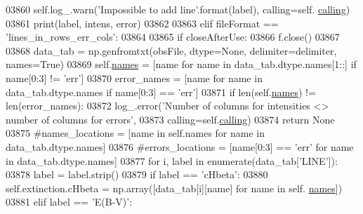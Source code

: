 \begin{DoxyCode}
03860                         self.log\_.warn(\textcolor{stringliteral}{'Impossible to add line'}.format(label), calling=self.
      \hyperlink{classpyneb_1_1core_1_1pynebcore_1_1_observation_a2639fad9af4fefad20e4097295bd40e7}{calling})
03861                         print(label, intens, error)
03862                         
03863         \textcolor{keywordflow}{elif} fileFormat == \textcolor{stringliteral}{'lines\_in\_rows\_err\_cols'}:
03864             
03865             \textcolor{keywordflow}{if} closeAfterUse:
03866                 f.close()
03867                 
03868             data\_tab = np.genfromtxt(obsFile, dtype=\textcolor{keywordtype}{None}, delimiter=delimiter, names=\textcolor{keyword}{True})
03869             self.\hyperlink{classpyneb_1_1core_1_1pynebcore_1_1_observation_a3f365d0b1488b2eba300bf71caf23c17}{names} = [name \textcolor{keywordflow}{for} name \textcolor{keywordflow}{in} data\_tab.dtype.names[1::] \textcolor{keywordflow}{if} name[0:3] != \textcolor{stringliteral}{'err'}]
03870             error\_names = [name \textcolor{keywordflow}{for} name \textcolor{keywordflow}{in} data\_tab.dtype.names \textcolor{keywordflow}{if} name[0:3] == \textcolor{stringliteral}{'err'}]
03871             \textcolor{keywordflow}{if} len(self.\hyperlink{classpyneb_1_1core_1_1pynebcore_1_1_observation_a3f365d0b1488b2eba300bf71caf23c17}{names}) != len(error\_names):
03872                 log\_.error(\textcolor{stringliteral}{'Number of columns for intensities <> number of columns for errors'},
03873                               calling=self.\hyperlink{classpyneb_1_1core_1_1pynebcore_1_1_observation_a2639fad9af4fefad20e4097295bd40e7}{calling})
03874                 \textcolor{keywordflow}{return} \textcolor{keywordtype}{None}
03875             \textcolor{comment}{#names\_locations = [name in self.names for name in data\_tab.dtype.names]}
03876             \textcolor{comment}{#errors\_locations = [name[0:3] == 'err' for name in data\_tab.dtype.names]}
03877             \textcolor{keywordflow}{for} i, label \textcolor{keywordflow}{in} enumerate(data\_tab[\textcolor{stringliteral}{'LINE'}]):
03878                 label = label.strip()
03879                 \textcolor{keywordflow}{if} label == \textcolor{stringliteral}{'cHbeta'}:
03880                     self.extinction.cHbeta = np.array([data\_tab[i][name] \textcolor{keywordflow}{for} name \textcolor{keywordflow}{in} self.
      \hyperlink{classpyneb_1_1core_1_1pynebcore_1_1_observation_a3f365d0b1488b2eba300bf71caf23c17}{names}])
03881                 \textcolor{keywordflow}{elif} label == \textcolor{stringliteral}{'E(B-V)'}:

\end{DoxyCode}
